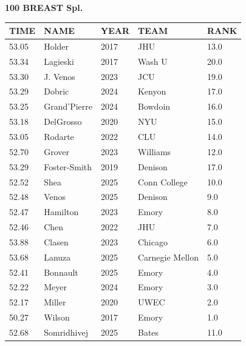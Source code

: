 \begin{table}[H]
\centering
\begin{minipage}[t]{0.6\textwidth}
\centering
\textbf{100 BREAST Spl.}\\[0.1cm]
\begin{tabular}{@{}p{1.8cm}p{2.8cm}p{1.2cm}p{1.4cm}p{0.8cm}@{}}
\hline
    \textbf{TIME} & \textbf{NAME} & \textbf{YEAR} & \textbf{TEAM} & \textbf{RANK} \\
\hline
    53.05 & Holder & 2017 & JHU & 13.0 \\
    53.34 & Lagieski & 2017 & Wash U & 20.0 \\
    53.30 & J. Venos & 2023 & JCU & 19.0 \\
    53.29 & Dobric & 2024 & Kenyon & 17.0 \\
    53.25 & Grand'Pierre & 2024 & Bowdoin & 16.0 \\
    53.18 & DelGrosso & 2020 & NYU & 15.0 \\
    53.05 & Rodarte & 2022 & CLU & 14.0 \\
    52.70 & Grover & 2023 & Williams & 12.0 \\
    53.29 & Foster-Smith & 2019 & Denison & 17.0 \\
    52.52 & Shea & 2025 & Conn College & 10.0 \\
    52.48 & Venos & 2025 & Denison & 9.0 \\
    52.47 & Hamilton & 2023 & Emory & 8.0 \\
    52.46 & Chen & 2022 & JHU & 7.0 \\
    53.88 & Clasen & 2023 & Chicago & 6.0 \\
    53.68 & Lanuza & 2025 & Carnegie Mellon & 5.0 \\
    52.41 & Bonnault & 2025 & Emory & 4.0 \\
    52.22 & Meyer & 2024 & Emory & 3.0 \\
    52.17 & Miller & 2020 & UWEC & 2.0 \\
    50.27 & Wilson & 2017 & Emory & 1.0 \\
    52.68 & Somridhivej & 2025 & Bates & 11.0 \\
\hline
\end{tabular}
\end{minipage}
\end{table}

